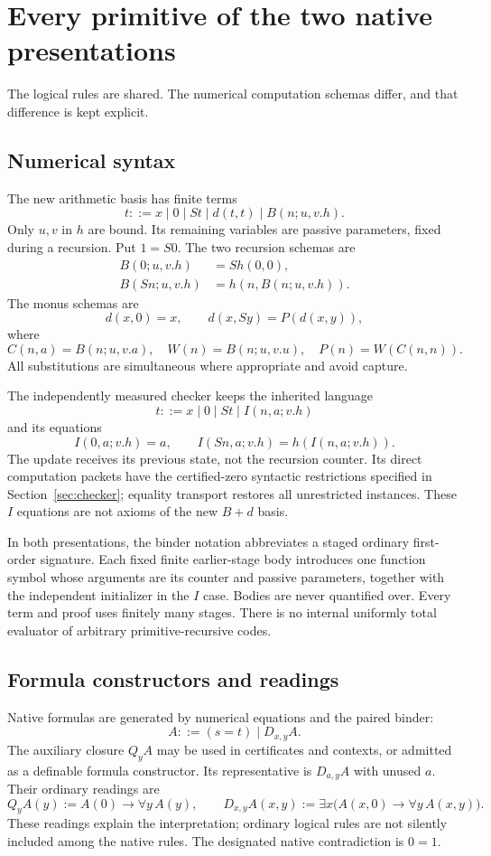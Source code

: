 \section{Every primitive of the two native presentations}
\label{sec:rules}

The logical rules are shared. The numerical computation schemas differ,
and that difference is kept explicit.

\subsection{Numerical syntax}
The new arithmetic basis has finite terms
\[
 t::=x\mid0\mid St\mid d(t,t)\mid B(n;u,v.h).
\]
Only $u,v$ in $h$ are bound. Its remaining variables are passive parameters,
fixed during a recursion. Put $1=S0$. The two recursion schemas are
\begin{align}
 B(0;u,v.h)&=S h(0,0),\tag{B0}\label{basis:b0}\\
 B(Sn;u,v.h)&=h(n,B(n;u,v.h)).\tag{BS}\label{basis:bs}
\end{align}
The monus schemas are
\[
 d(x,0)=x,\qquad d(x,Sy)=P(d(x,y)),
 \tag{M0, MS}
\]
where
\[
 C(n,a)=B(n;u,v.a),\quad W(n)=B(n;u,v.u),\quad
 P(n)=W(C(n,n)).
\]
All substitutions are simultaneous where appropriate and avoid capture.

The independently measured checker keeps the inherited language
\[
 t::=x\mid0\mid St\mid I(n,a;v.h)
\]
and its equations
\[
 I(0,a;v.h)=a,\qquad I(Sn,a;v.h)=h(I(n,a;v.h)).
 \tag{I0, IS}
\]
The update receives its previous state, not the recursion counter. Its
direct computation packets have the certified-zero syntactic restrictions
specified in Section~\ref{sec:checker}; equality transport restores all
unrestricted instances. These $I$ equations are not axioms of the new
$B+d$ basis.

In both presentations, the binder notation abbreviates a staged ordinary
first-order signature. Each fixed finite earlier-stage body introduces
one function symbol whose arguments are its counter and passive
parameters, together with the independent initializer in the $I$ case.
Bodies are never quantified over. Every term and proof uses finitely many
stages. There is no internal uniformly total evaluator of arbitrary
primitive-recursive codes.

\subsection{Formula constructors and readings}
Native formulas are generated by numerical equations and the paired
binder:
\[
 A::=(s=t)\mid D_{x,y}A.
\]
The auxiliary closure $Q_yA$ may be used in certificates and contexts,
or admitted as a definable formula constructor. Its representative is
$D_{a,y}A$ with unused $a$. Their ordinary readings are
\[
 Q_yA(y):=A(0)\to\forall y\,A(y),\qquad
 D_{x,y}A(x,y):=\exists x\bigl(A(x,0)\to\forall y\,A(x,y)\bigr).
\]
These readings explain the interpretation; ordinary logical rules are
not silently included among the native rules. The designated native
contradiction is $0=1$.

